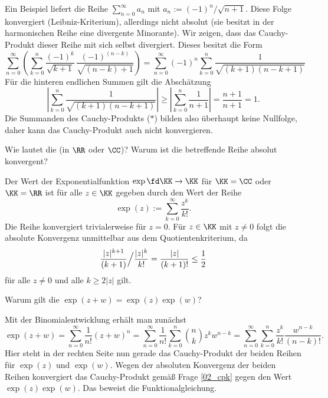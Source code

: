 \begin{antwort}
  Ein Beispiel liefert die Reihe $\sum_{n=0}^\infty a_n$ mit 
  $a_n := (-1)^n/ \sqrt{n+1}$. Diese Folge konvergiert (Leibniz-Kriterium), 
  allerdings nicht absolut (sie besitzt in der 
  harmonischen Reihe eine divergente Minorante). 
  Wir zeigen, dass das Cauchy-Produkt dieser Reihe mit sich selbst 
  divergiert. Dieses besitzt die Form 
  \begin{equation}
    \sum_{n=0}^{\infty} \left( 
      \sum_{k=0}^n \frac{(-1)^k}{\sqrt{k+1}} \, 
      \frac{(-1)^{(n-k)}}{\sqrt{(n-k)+1}} \right) 
    =
    \sum_{n=0}^{\infty} (-1)^n \sum_{k=0}^n \frac{1}{\sqrt{ (k+1)(n-k+1)}}
    \tag{$\ast$}
  \end{equation}
  Für die hinteren endlichen Summen gilt die Abschätzung  
  \[
  \left| \sum_{k=0}^n \frac{1}{\sqrt{(k+1)(n-k+1)}} \right| \ge 
  \left| \sum_{k=0}^n \frac{1}{n+1} \right| = \frac{n+1}{n+1} = 1.
  \]
  Die Summanden des Cauchy-Produkts ($\ast$) bilden also 
  überhaupt keine Nullfolge, daher kann das Cauchy-Produkt auch nicht 
  konvergieren. \AntEnd  
\end{antwort}

\begin{frage}\label{02_expd}
  Wie lautet die 
   (in $\RR$ oder $\CC$)? 
  Warum ist die betreffende Reihe absolut konvergent?
\end{frage}

\begin{antwort}
  Der Wert der Exponentialfunktion $\exp\fd \KK\to \KK$ für 
  $\KK=\CC$ oder $\KK=\RR$ ist für alle 
  $z \in \KK$ gegeben durch den Wert der Reihe
  \[
  \exp( z ) := \sum_{k=0}^\infty \frac{z^k}{k!}.
  \]
  Die Reihe konvergiert trivialerweise für $z=0$. 
  Für $z\in \KK$ mit $z\not=0$ folgt die absolute 
  Konvergenz unmittelbar aus dem Quotientenkriterium, da 
  \[
  \frac{|z|^{k+1}}{(k+1)} \Big{/} \frac{|z|^{k}}{k!}
  = \frac{|z|}{(k+1)!} \le \frac{1}{2}
  \]
  für alle $z\not=0$ und alle $k\ge 2|z|$ gilt.\AntEnd
\end{antwort}

\begin{frage}\label{02_expfunk}
  Warum gilt die  $\exp( z+w)=\exp( z )\exp(w)$?
\end{frage}

\begin{antwort}
  Mit der Binomialentwicklung erhält man zunächst
  \[
  \exp( z+w )= \sum_{n=0}^\infty  \frac{1}{n!} (z+w)^n = 
  \sum_{n=0}^\infty \frac{1}{n!} \sum_{k=0}^n \binom{n}{k} z^k w^{n-k} =
  \sum_{n=0}^\infty \sum_{k=0}^n \frac{z^k}{k!} \frac{w^{n-k}}{(n-k)!}.
  \]
  Hier steht in der rechten Seite nun gerade das Cauchy-Produkt der 
  beiden Reihen für $\exp(z)$ und $\exp(w)$. Wegen der absoluten Konvergenz 
  der beiden Reihen konvergiert das Cauchy-Produkt 
  gemäß Frage \ref{02_cpk} gegen den Wert $\exp(z)\exp(w)$. Das beweist die Funktionalgleichung.\AntEnd 
\end{antwort} 


